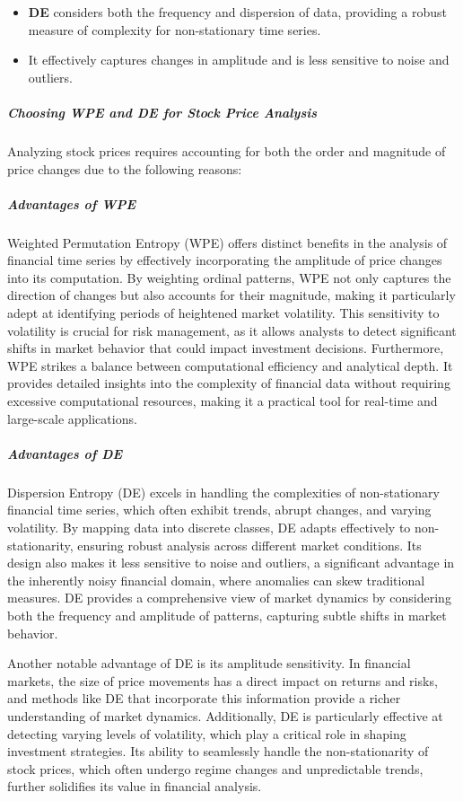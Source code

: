 \begin{itemize} \item \textbf{DE} considers both the frequency and dispersion of data, providing a robust measure of complexity for non-stationary time series. \item It effectively captures changes in amplitude and is less sensitive to noise and outliers. \end{itemize}

\subparagraph{Choosing WPE and DE for Stock Price Analysis}
Analyzing stock prices requires accounting for both the order and magnitude of price changes due to the following reasons:

\subparagraph{Advantages of WPE}

Weighted Permutation Entropy (WPE) offers distinct benefits in the analysis of financial time series by effectively incorporating the amplitude of price changes into its computation. By weighting ordinal patterns, WPE not only captures the direction of changes but also accounts for their magnitude, making it particularly adept at identifying periods of heightened market volatility. This sensitivity to volatility is crucial for risk management, as it allows analysts to detect significant shifts in market behavior that could impact investment decisions. Furthermore, WPE strikes a balance between computational efficiency and analytical depth. It provides detailed insights into the complexity of financial data without requiring excessive computational resources, making it a practical tool for real-time and large-scale applications.


\subparagraph{Advantages of DE}

Dispersion Entropy (DE) excels in handling the complexities of non-stationary financial time series, which often exhibit trends, abrupt changes, and varying volatility. By mapping data into discrete classes, DE adapts effectively to non-stationarity, ensuring robust analysis across different market conditions. Its design also makes it less sensitive to noise and outliers, a significant advantage in the inherently noisy financial domain, where anomalies can skew traditional measures. DE provides a comprehensive view of market dynamics by considering both the frequency and amplitude of patterns, capturing subtle shifts in market behavior.

Another notable advantage of DE is its amplitude sensitivity. In financial markets, the size of price movements has a direct impact on returns and risks, and methods like DE that incorporate this information provide a richer understanding of market dynamics. Additionally, DE is particularly effective at detecting varying levels of volatility, which play a critical role in shaping investment strategies. Its ability to seamlessly handle the non-stationarity of stock prices, which often undergo regime changes and unpredictable trends, further solidifies its value in financial analysis.

